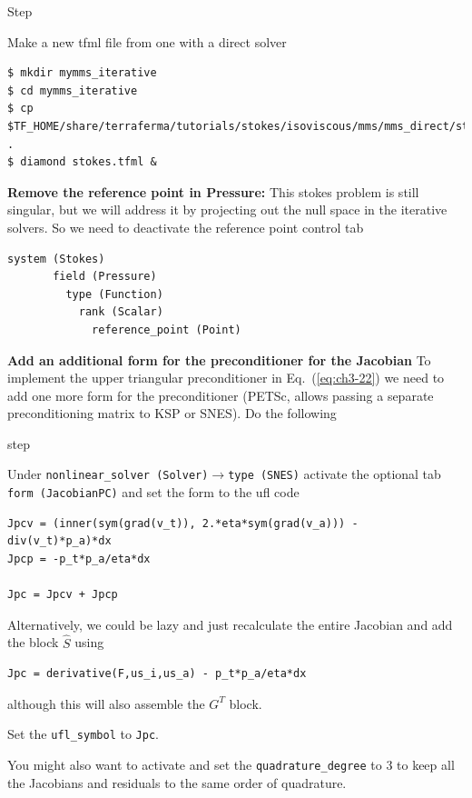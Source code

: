 \begin{steps}{Step}
\item Make a new tfml file from one with a direct solver
  \begin{lstlisting}[style=Bash]
$ mkdir mymms_iterative
$ cd mymms_iterative
$ cp $TF_HOME/share/terraferma/tutorials/stokes/isoviscous/mms/mms_direct/stokes.tfml .
$ diamond stokes.tfml &
  \end{lstlisting}%
\item \textbf{Remove the reference point in Pressure:} This stokes
  problem is still singular, but we will address it by projecting out
  the null space in the iterative solvers.  So we need to deactivate the
  reference point control tab
  \begin{lstlisting}[style=Python]
    system (Stokes)
       field (Pressure)
         type (Function)
           rank (Scalar)
             reference_point (Point)
  \end{lstlisting}
\item \textbf{Add an additional form for the preconditioner for the
    Jacobian} To implement the upper triangular preconditioner in Eq.\
  (\ref{eq:ch3-22}) we need to add one more form for the preconditioner
  (PETSc, allows passing a separate preconditioning matrix to KSP or
  SNES). Do the following
  \begin{steps}{step}
  \item Under \texttt{nonlinear\_solver
    (Solver)}$\rightarrow$\texttt{type (SNES)} activate the optional
  tab \texttt{form (JacobianPC)} and set the form to the ufl code
  \begin{lstlisting}[style=UFL]
Jpcv = (inner(sym(grad(v_t)), 2.*eta*sym(grad(v_a))) - div(v_t)*p_a)*dx
Jpcp = -p_t*p_a/eta*dx

Jpc = Jpcv + Jpcp
  \end{lstlisting}
Alternatively,  we could be lazy and just recalculate the entire
Jacobian and add the  block $\hat{S}$ using
\begin{lstlisting}[style=UFL]
Jpc = derivative(F,us_i,us_a) - p_t*p_a/eta*dx
\end{lstlisting}
although this will also assemble the $G^{T}$ block.
\item Set the \texttt{ufl\_symbol} to
  \texttt{Jpc}.
\item You might also want to activate and set the
  \texttt{quadrature\_degree} to 3 to keep all the Jacobians and
  residuals to the same order of quadrature.
  \end{steps}


\end{steps}

